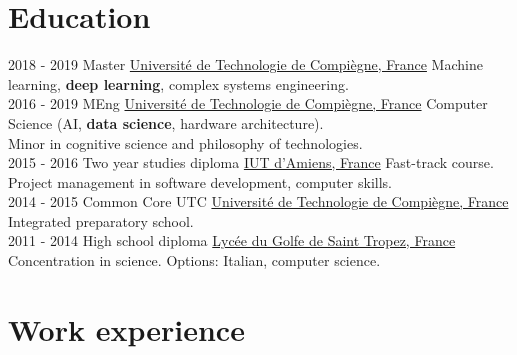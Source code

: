 \documentclass[a4paper]{twentysecondcv} %
\begin{document}
\makeprofile %


\section{Education}

\begin{twenty} %
	\twentyitem
    	{2018 - 2019}
        {}
        {Master}
        {\href{https://www.utc.fr/}{Université de Technologie de Compiègne, France}}
        {}
        {Machine learning, \textbf{deep learning}, complex systems engineering.}
    \\
	\twentyitem
    	{2016 - 2019}
        {}
        {MEng}
        {\href{https://www.utc.fr/}{Université de Technologie de Compiègne, France}}
        {}
        {Computer Science (AI, \textbf{data science}, hardware architecture).\\Minor in cognitive science and philosophy of technologies.}
    \\
	\twentyitem
    	{2015 - 2016}
        {}
        {Two year studies diploma}
        {\href{http://www.iut-amiens.fr/}{IUT d'Amiens, France}}
        {}
        {Fast-track course.\\Project management in software development, computer skills.}
    \\
	\twentyitem
    	{2014 - 2015}
        {}
        {Common Core UTC}
        {\href{https://www.utc.fr/}{Université de Technologie de Compiègne, France}}
        {}
        {Integrated preparatory school.}
    \\
	\twentyitem
    	{2011 - 2014}
		{}
        {High school diploma}
        {\href{http://www.lyc-du-golfe-de-saint-tropez.ac-nice.fr/}{Lycée du Golfe de Saint Tropez, France}}
        {}
        {Concentration in science. Options: Italian, computer science.}
\end{twenty}


\section{Work experience}
\end{document}
